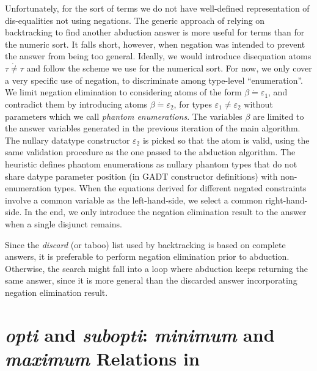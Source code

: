 \documentclass{article}
\newcommand{\tmem}[1]{{\em #1\/}}
\newcommand{\tmverbatim}[1]{{\ttfamily{#1}}}
\begin{document}
Unfortunately, for the sort of terms we do not have well-defined
representation of dis-equalities not using negations. The generic approach of
relying on backtracking to find another abduction answer is more useful for
terms than for the numeric sort. It falls short, however, when negation was
intended to prevent the answer from being too general. Ideally, we would
introduce disequation atoms $\tau \dot{\neq} \tau$ and follow the scheme we
use for the numerical sort. For now, we only cover a very specific use of
negation, to discriminate among type-level ``enumeration''. We limit negation
elimination to considering atoms of the form $\beta \dot{=} \varepsilon_1$,
and contradict them by introducing atoms $\beta \dot{=} \varepsilon_2$, for
types $\varepsilon_1 \neq \varepsilon_2$ without parameters which we call
{\tmem{phantom enumerations}}. The variables $\beta$ are limited to the answer
variables generated in the previous iteration of the main algorithm. The
nullary datatype constructor $\varepsilon_2$ is picked so that the atom is
valid, using the same validation procedure as the one passed to the abduction
algorithm. The heuristic defines phantom enumerations as nullary phantom types
that do not share datype parameter position (in GADT constructor definitions)
with non-enumeration types. When the equations derived for different negated
constraints involve a common variable as the left-hand-side, we select a
common right-hand-side. In the end, we only introduce the negation elimination
result to the answer when a single disjunct remains.

Since the {\tmem{discard}} (or taboo) list used by backtracking is based on
complete answers, it is preferable to perform negation elimination prior to
abduction. Otherwise, the search might fall into a loop where abduction keeps
returning the same answer, since it is more general than the discarded answer
incorporating negation elimination result.

\section{{\tmem{opti}} and {\tmem{subopti}}: {\tmem{minimum}} and
{\tmem{maximum}} Relations in \tmverbatim{num}}\label{OptiAtoms}
\end{document}
